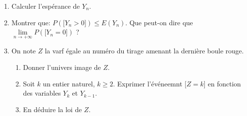 \documentclass[a4paper, 11pt,reqno]{article}
\begin{document}
\begin{exercice}
\begin{enumerate}
		\item Calculer l'esp\'erance de $Y_n$.
		\item Montrer que: $P(\lbrack Y_n>0\rbrack)\leq E(Y_n)$. Que peut-on dire que $\lim\limits_{n\to +\infty} P(\lbrack Y_n=0\rbrack)$ ?
		\item On note $Z$ la varf \'egale au num\'ero du tirage amenant la derni\`ere boule rouge.
		      \begin{enumerate}
			      \item Donner l'univers image de $Z$.
			      \item Soit $k$ un entier naturel, $k\geq 2$. Exprimer l'\'ev\'eneemnt $\lbrack Z=k\rbrack$ en fonction des variables $Y_{k}$ et $Y_{k-1}$.
			      \item En d\'eduire la loi de $Z$.
		      \end{enumerate}
	\end{enumerate}
\end{exercice}
\end{document}
